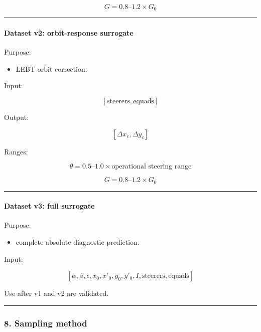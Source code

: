 \documentclass[
]{article}
\providecommand{\tightlist}{%
  \setlength{\itemsep}{0pt}\setlength{\parskip}{0pt}}
\begin{document}
\[
G = 0.8\text{--}1.2\times G_0
\]

\begin{center}\rule{0.5\linewidth}{0.5pt}\end{center}

\hypertarget{dataset-v2-orbit-response-surrogate}{%
\paragraph{Dataset v2: orbit-response
surrogate}\label{dataset-v2-orbit-response-surrogate}}

Purpose:

\begin{itemize}
\tightlist
\item
  LEBT orbit correction.
\end{itemize}

Input:

\[
[
\mathrm{steerers},
\mathrm{equads}
]
\]

Output:

\[
[
\Delta x_c,\Delta y_c
]
\]

Ranges:

\[
\theta = 0.5\text{--}1.0\times \text{operational steering range}
\]

\[
G = 0.8\text{--}1.2\times G_0
\]

\begin{center}\rule{0.5\linewidth}{0.5pt}\end{center}

\hypertarget{dataset-v3-full-surrogate}{%
\paragraph{Dataset v3: full surrogate}\label{dataset-v3-full-surrogate}}

Purpose:

\begin{itemize}
\tightlist
\item
  complete absolute diagnostic prediction.
\end{itemize}

Input:

\[
[
\alpha,\beta,\epsilon,
x_0,x'_0,y_0,y'_0,
I,
\mathrm{steerers},
\mathrm{equads}
]
\]

Use after v1 and v2 are validated.

\begin{center}\rule{0.5\linewidth}{0.5pt}\end{center}

\hypertarget{sampling-method}{%
\subsubsection{8. Sampling method}\label{sampling-method}}
\end{document}
